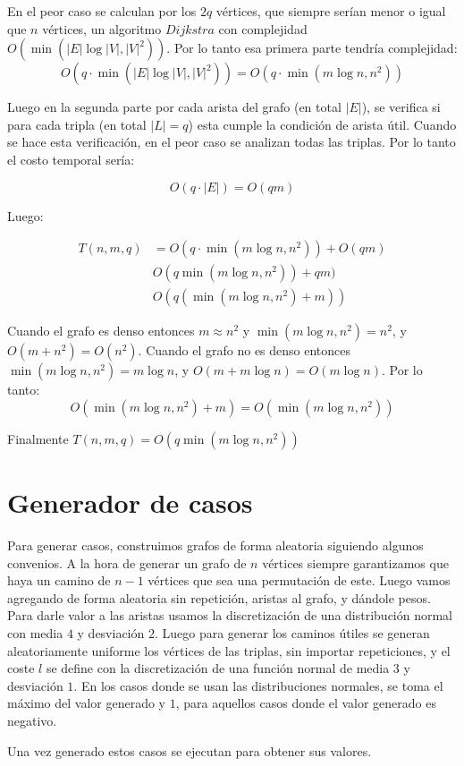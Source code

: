 \documentclass[a4paper]{article}
\begin{document}
	En el peor caso se calculan por los $2q$ vértices, que siempre serían menor o igual que $n$ vértices, un algoritmo $Dijkstra$ con complejidad $O(\min(|E|\log|V|, |V|^2))$. Por lo tanto esa primera parte tendría complejidad:
	$$ O(q \cdot \min(|E|\log|V|, |V|^2)) = O(q\cdot \min(m\log n, n^2)) $$
	
	Luego en la segunda parte por cada arista del grafo (en total $|E|$), se verifica si para cada tripla (en total $|L| = q$) esta cumple la condición de arista útil. Cuando se hace esta verificación, en el peor caso se analizan todas las triplas. Por lo tanto el costo temporal sería:
	
	$$ O(q \cdot |E|) = O(qm) $$
	
	Luego:
	
	\begin{align*}
		T(n,m,q) & = O(q\cdot \min(m\log n, n^2)) + O(qm)\\
		& O(q \min(m\log n, n^2)) + qm) \\
		& O(q (\min(m\log n, n^2) + m))
	\end{align*}

	Cuando el grafo es denso entonces $m \approx n^2$ y $\min(m\log n, n^2) = n^2$, y $O(m + n^2) = O(n^2)$. Cuando el grafo no es denso entonces $\min(m\log n, n^2) = m\log n$, y $O(m + m\log n) = O(m\log n)$. Por lo tanto:
	$$ O(\min(m\log n, n^2) + m) = O(\min(m\log n, n^2)) $$
	
	Finalmente $T(n,m,q) = O(q\min(m\log n, n^2))$
			
    \section*{Generador de casos}
    
    Para generar casos, construimos grafos de forma aleatoria siguiendo algunos convenios. A la hora de generar un grafo de $n$ vértices siempre garantizamos que haya un camino de $n-1$ vértices que sea una permutación de este. Luego vamos agregando de forma aleatoria sin repetición, aristas al grafo, y dándole pesos. Para darle valor a las aristas usamos la discretización de una distribución normal con media $4$ y desviación $2$. Luego para generar los caminos útiles se generan aleatoriamente uniforme los vértices de las triplas, sin importar repeticiones, y el coste $l$ se define con la discretización de una función normal de media $3$ y desviación $1$. En los casos donde se usan las distribuciones normales, se toma el máximo del valor generado y $1$, para aquellos casos donde el valor generado es negativo.
    
    Una vez generado estos casos se ejecutan para obtener sus valores.
    
    
\end{document}
